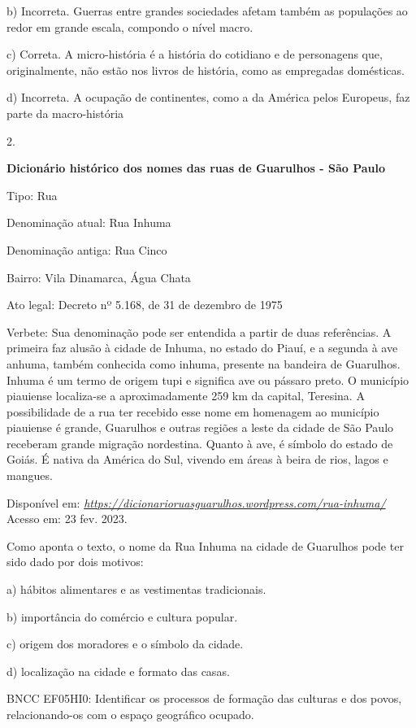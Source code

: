 b) Incorreta. Guerras entre grandes sociedades afetam também as
populações ao redor em grande escala, compondo o nível macro.

c) Correta. A micro-história é a história do cotidiano e de personagens
que, originalmente, não estão nos livros de história, como as empregadas
domésticas.

d) Incorreta. A ocupação de continentes, como a da América pelos
Europeus, faz parte da macro-história

2.

\textbf{Dicionário histórico dos nomes das ruas de Guarulhos - São
Paulo}

Tipo: Rua

Denominação atual: Rua Inhuma

Denominação antiga: Rua Cinco

Bairro: Vila Dinamarca, Água Chata

Ato legal: Decreto nº 5.168, de 31 de dezembro de 1975

Verbete: Sua denominação pode ser entendida a partir de duas
referências. A primeira faz alusão à cidade de Inhuma, no estado do
Piauí, e a segunda à ave anhuma, também conhecida como inhuma, presente
na bandeira de Guarulhos. Inhuma é um termo de origem tupi e significa
ave ou pássaro preto. O município piauiense localiza-se a
aproximadamente 259 km da capital, Teresina. A possibilidade de a rua
ter recebido esse nome em homenagem ao município piauiense é grande,
Guarulhos e outras regiões a leste da cidade de São Paulo receberam
grande migração nordestina. Quanto à ave, é símbolo do estado de Goiás.
É nativa da América do Sul, vivendo em áreas à beira de rios, lagos e
mangues.

Disponível em:
\href{https://dicionarioruasguarulhos.wordpress.com/rua-inhuma/}{\emph{https://dicionarioruasguarulhos.wordpress.com/rua-inhuma/}}
Acesso em: 23 fev. 2023.

Como aponta o texto, o nome da Rua Inhuma na cidade de Guarulhos pode
ter sido dado por dois motivos:

a) hábitos alimentares e as vestimentas tradicionais.

b) importância do comércio e cultura popular.

c) origem dos moradores e o símbolo da cidade.

d) localização na cidade e formato das casas.

BNCC EF05HI0: Identificar os processos de formação das culturas e dos
povos, relacionando-os com o espaço geográfico ocupado.

